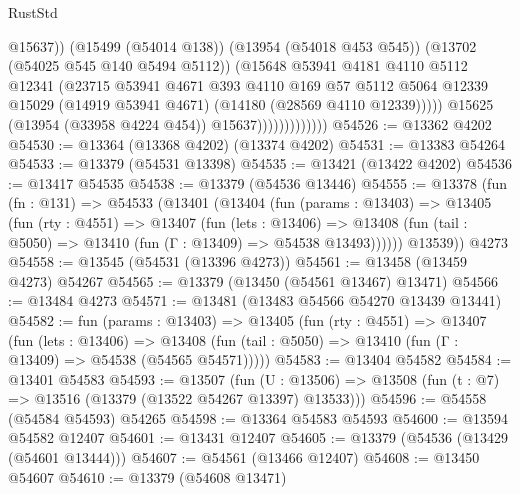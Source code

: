 \begin{lexlean}{RustStd}
\begin{coremodule}
                                    @15637))
                                (@15499 (@54014 @138))
                                (@13954 (@54018 @453 @545))
                                (@13702 (@54025 @545 @140 @5494 @5112))
                                (@15648
                                  @53941
                                  @4181
                                  @4110
                                  @5112
                                  @12341
                                  (@23715
                                    @53941
                                    @4671
                                    @393
                                    @4110
                                    @169
                                    @57
                                    @5112
                                    @5064
                                    @12339
                                    @15029
                                    (@14919 @53941 @4671)
                                    (@14180 (@28569 @4110 @12339)))))
                              @15625
                              (@13954 (@33958 @4224 @454))
                              @15637)))))))))))))
@54526 := @13362 @4202
@54530 := @13364 (@13368 @4202) (@13374 @4202)
@54531 := @13383 @54264
@54533 := @13379 (@54531 @13398)
@54535 := @13421 (@13422 @4202)
@54536 := @13417 @54535
@54538 := @13379 (@54536 @13446)
@54555 := @13378
    (fun (fn : @131) =>
    @54533
      (@13401
        (@13404
          (fun (params : @13403) =>
          @13405
            (fun (rty : @4551) =>
            @13407
              (fun (lets : @13406) =>
              @13408 (fun (tail : @5050) => @13410 (fun (Γ : @13409) => @54538 @13493))))))
        @13539))
    @4273
@54558 := @13545 (@54531 (@13396 @4273))
@54561 := @13458 (@13459 @4273) @54267
@54565 := @13379 (@13450 (@54561 @13467) @13471)
@54566 := @13484 @4273
@54571 := @13481 (@13483 @54566 @54270 @13439 @13441)
@54582 := fun (params : @13403) =>
  @13405
    (fun (rty : @4551) =>
    @13407
      (fun (lets : @13406) =>
      @13408 (fun (tail : @5050) => @13410 (fun (Γ : @13409) => @54538 (@54565 @54571)))))
@54583 := @13404 @54582
@54584 := @13401 @54583
@54593 := @13507
    (fun (U : @13506) => @13508 (fun (t : @7) => @13516 (@13379 (@13522 @54267 @13397) @13533)))
@54596 := @54558 (@54584 @54593) @54265
@54598 := @13364 @54583 @54593
@54600 := @13594 @54582 @12407
@54601 := @13431 @12407
@54605 := @13379 (@54536 (@13429 (@54601 @13444)))
@54607 := @54561 (@13466 @12407)
@54608 := @13450 @54607
@54610 := @13379 (@54608 @13471)

\end{coremodule}
\end{lexlean}
